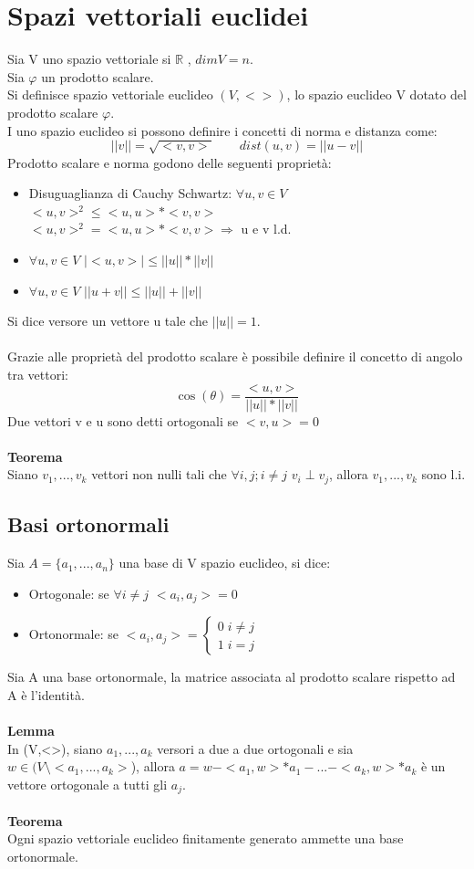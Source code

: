 \documentclass{article}
\newcommand{\R}{\mathds{R}}
\begin{document}
\section{Spazi vettoriali euclidei}
Sia V uno spazio vettoriale si $\R$ , $dimV=n$.\\
Sia $\varphi$ un prodotto scalare.\\
Si definisce spazio vettoriale euclideo $(V,<>)$, lo spazio euclideo V dotato del prodotto scalare $\varphi$.\\
I uno spazio euclideo si possono definire i concetti di norma e distanza come:
$$||v||=\sqrt{<v,v>}\qquad dist(u,v)=||u-v||$$
Prodotto scalare e norma godono delle seguenti proprietà:
\begin{itemize}
    \item Disuguaglianza di Cauchy Schwartz: $\forall u,v\in V$ $<u,v>^2\leq<u,u>*<v,v>$\\
    $<u,v>^2=<u,u>*<v,v>\Rightarrow$ u e v l.d.
    \item $\forall u,v\in V$ $|<u,v>|\leq||u||*||v||$
    \item $\forall u,v\in V$ $||u+v||\leq||u||+||v||$
\end{itemize}
Si dice versore un vettore u tale che $||u||=1$.\\\\
Grazie alle proprietà del prodotto scalare è possibile definire il concetto di angolo tra vettori:
$$\cos(\theta)=\frac{<u,v>}{||u||*||v||}$$
Due vettori v e u sono detti ortogonali se $<v,u>=0$\\\\
\textbf{Teorema}\\
Siano $v_1,...,v_k$ vettori non nulli tali che $\forall i,j;i\neq j$ $v_i\perp v_j$, allora $v_1,...,v_k$ sono l.i.

\subsection{Basi ortonormali}
Sia $A=\{a_1,...,a_n\}$ una base di V spazio euclideo, si dice:
\begin{itemize}
    \item Ortogonale: se $\forall i\neq j$ $<a_i,a_j>=0$
    \item Ortonormale: se $<a_i,a_j>=\begin{cases} 0\;i\neq j \\ 1\; i=j  \end{cases}$
\end{itemize}
Sia A una base ortonormale, la matrice associata al prodotto scalare rispetto ad A è l'identità.\\\\
\textbf{Lemma}\\
In (V,<>), siano $a_1,...,a_k$ versori a due a due ortogonali e sia $w\in (V\setminus<a_1,...,a_k>$), allora $a=w-<a_1,w>*a_1-...-<a_k,w>*a_k$ è un vettore ortogonale a tutti gli $a_j$.\\\\
\textbf{Teorema}\\
Ogni spazio vettoriale euclideo finitamente generato ammette una base ortonormale.
\end{document}
